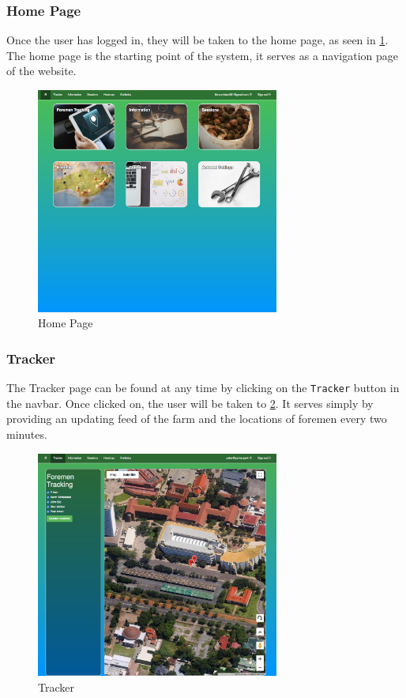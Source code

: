 \documentclass[11pt]{article}
\begin{document}
\subsubsection{Home Page}
\label{webHome}
Once the user has logged in, they will be taken to the home page, as seen in \ref{webHomeImage}. The home page is the starting point of the system, it serves as a navigation page of the website.

\begin{figure}
 \centering
 \includegraphics[width=8cm, keepaspectratio]{Images/UsingSystem/WebHome.png}
 \caption{Home Page}
 \label{webHomeImage}
\end{figure}

\subsubsection{Tracker}
\label{webTracker}
The Tracker page can be found at any time by clicking on the \texttt{Tracker} button in the navbar. Once clicked on, the user will be taken to \ref{webTrackerImage}. It serves simply by providing an updating feed of the farm and the locations of foremen every two minutes.

\begin{figure}
 \centering
 \includegraphics[width=8cm, keepaspectratio]{Images/UsingSystem/WebTracker.png}
 \caption{Tracker}
 \label{webTrackerImage}
\end{figure}
\end{document}
